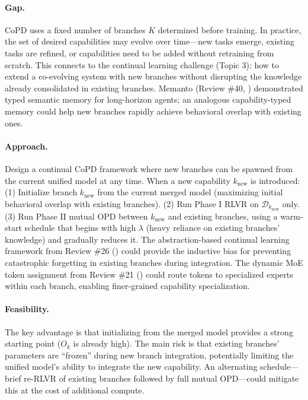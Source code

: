 \documentclass[11pt]{article}
\begin{document}
\paragraph{Gap.}
CoPD uses a fixed number of branches $K$ determined before training. In practice, the set of desired capabilities may evolve over time---new tasks emerge, existing tasks are refined, or capabilities need to be added without retraining from scratch. This connects to the continual learning challenge (Topic 3): how to extend a co-evolving system with new branches without disrupting the knowledge already consolidated in existing branches. Memanto (Review \#40, \cite{memanto}) demonstrated typed semantic memory for long-horizon agents; an analogous capability-typed memory could help new branches rapidly achieve behavioral overlap with existing ones.

\paragraph{Approach.}
Design a continual CoPD framework where new branches can be spawned from the current unified model at any time. When a new capability $k_{\mathrm{new}}$ is introduced: (1) Initialize branch $k_{\mathrm{new}}$ from the current merged model (maximizing initial behavioral overlap with existing branches). (2) Run Phase I RLVR on $\mathcal{D}_{k_{\mathrm{new}}}$ only. (3) Run Phase II mutual OPD between $k_{\mathrm{new}}$ and existing branches, using a warm-start schedule that begins with high $\lambda$ (heavy reliance on existing branches' knowledge) and gradually reduces it. The abstraction-based continual learning framework from Review \#26 (\cite{abstraction}) could provide the inductive bias for preventing catastrophic forgetting in existing branches during integration. The dynamic MoE token assignment from Review \#21 (\cite{dynamicmoe}) could route tokens to specialized experts within each branch, enabling finer-grained capability specialization.

\paragraph{Feasibility.}
The key advantage is that initializing from the merged model provides a strong starting point ($O_k$ is already high). The main risk is that existing branches' parameters are ``frozen'' during new branch integration, potentially limiting the unified model's ability to integrate the new capability. An alternating schedule---brief re-RLVR of existing branches followed by full mutual OPD---could mitigate this at the cost of additional compute.
\end{document}
